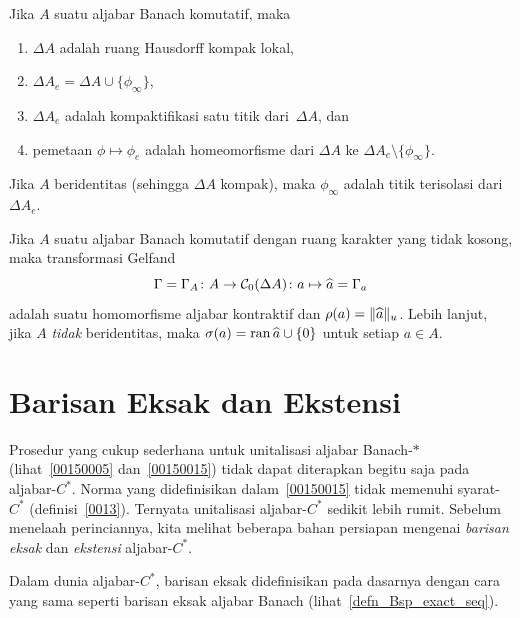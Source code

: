 \begin{prop} Jika $A$ suatu aljabar Banach komutatif, maka
 \begin{enumerate}
    \item[(a)] $\Delta A$ adalah ruang Hausdorff kompak lokal,
    \item[(b)] $\Delta A_e = \Delta A \cup \{\phi_\infty\}$,
    \item[(c)] $\Delta A_e$ adalah kompaktifikasi satu titik dari~$\Delta A$, dan
    \item[(d)] pemetaan $\phi \mapsto \phi_e$ adalah homeomorfisme dari $\Delta A$ ke
$\Delta A_e \setminus \{\phi_\infty\}$.
 \end{enumerate}
Jika $A$ beridentitas (sehingga $\Delta A$ kompak), maka $\phi_\infty$ adalah titik
terisolasi dari~$\Delta A_e$.
\end{prop}

\begin{thm} Jika $A$ suatu aljabar Banach komutatif dengan ruang karakter yang tidak kosong,
maka transformasi Gelfand
  \[ \Gamma = \Gamma_A\colon A \rightarrow \mathcal{C}_0(\Delta A)\colon a \mapsto \widehat{a} = \Gamma_a \]
adalah suatu homomorfisme aljabar kontraktif dan $\rho(a) = \lVert\widehat{a}\rVert_u$. Lebih lanjut,
jika $A$ \emph{tidak} beridentitas, maka $\sigma(a) = \operatorname{ran} \widehat{a} \cup \{0\}$ untuk setiap
$a \in A$.
\end{thm}

















\section{Barisan Eksak dan Ekstensi}
Prosedur yang cukup sederhana untuk unitalisasi aljabar Banach-$*\,$
(lihat~\ref{00150005} dan~\ref{00150015}) tidak dapat diterapkan begitu saja pada
aljabar-$C^*$. Norma yang didefinisikan dalam~\ref{00150015} tidak memenuhi syarat-$C^*$
(definisi~\ref{0013}). Ternyata unitalisasi aljabar-$C^*$ sedikit lebih rumit. Sebelum
menelaah perinciannya, kita melihat beberapa bahan persiapan mengenai \emph{barisan eksak}
dan \emph{ekstensi} aljabar-$C^*$.

Dalam dunia aljabar-$C^*$, barisan eksak didefinisikan pada dasarnya dengan cara yang sama
seperti barisan eksak aljabar Banach (lihat~\ref{defn_Bsp_exact_seq}).

